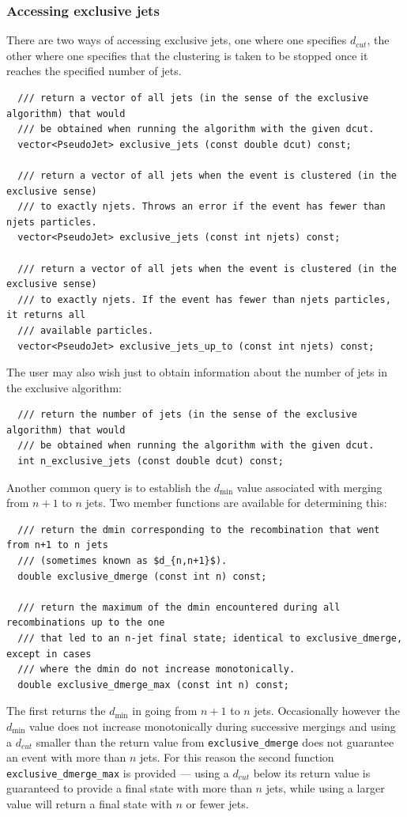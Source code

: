 \documentclass[12pt,a4]{article}
\newcommand{\ttt}[1]{{\small\texttt{#1}}}
\begin{document}
\subsubsection{Accessing exclusive jets}
There are two ways of accessing exclusive jets,
one where one specifies
$d_{cut}$, the other where one specifies that the clustering is taken
to be stopped once it reaches the specified number of jets.
\begin{lstlisting}
  /// return a vector of all jets (in the sense of the exclusive algorithm) that would 
  /// be obtained when running the algorithm with the given dcut.
  vector<PseudoJet> exclusive_jets (const double dcut) const;

  /// return a vector of all jets when the event is clustered (in the exclusive sense) 
  /// to exactly njets. Throws an error if the event has fewer than njets particles.
  vector<PseudoJet> exclusive_jets (const int njets) const;

  /// return a vector of all jets when the event is clustered (in the exclusive sense) 
  /// to exactly njets. If the event has fewer than njets particles, it returns all
  /// available particles.
  vector<PseudoJet> exclusive_jets_up_to (const int njets) const;
\end{lstlisting}
%
The user may also wish just to obtain information about the number of
jets in the exclusive algorithm:
\begin{lstlisting}
  /// return the number of jets (in the sense of the exclusive algorithm) that would 
  /// be obtained when running the algorithm with the given dcut.
  int n_exclusive_jets (const double dcut) const;
\end{lstlisting}
Another common query is to establish the $d_{\min}$ value associated
with merging from $n+1$ to $n$ jets. Two member functions are
available for determining this:
\begin{lstlisting}
  /// return the dmin corresponding to the recombination that went from n+1 to n jets 
  /// (sometimes known as $d_{n,n+1}$).
  double exclusive_dmerge (const int n) const;

  /// return the maximum of the dmin encountered during all recombinations up to the one 
  /// that led to an n-jet final state; identical to exclusive_dmerge, except in cases 
  /// where the dmin do not increase monotonically.
  double exclusive_dmerge_max (const int n) const;
\end{lstlisting}
The first returns the $d_{\min}$  in going from $n+1$ to $n$ jets. 
%
Occasionally however the $d_{\min}$ value does not increase
monotonically during successive mergings and using a $d_{cut}$ smaller
than the return value from \ttt{exclusive\_dmerge} does not guarantee
an event with more than $n$ jets.
%
For this reason the second function \ttt{exclusive\_dmerge\_max} is
provided --- using a $d_{cut}$ below its return value is guaranteed to
provide a final state with more than $n$ jets, while using a larger
value will return a final state with $n$ or fewer jets.
\end{document}
